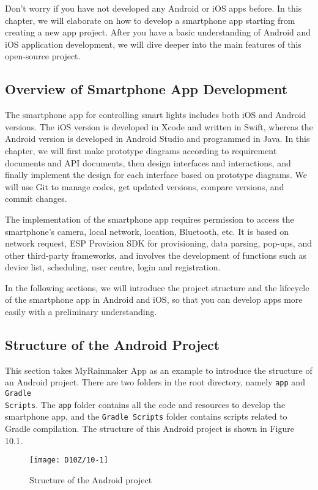 \documentclass[a4paper,12pt]{book}
\begin{document}
Don’t worry if you have not developed any Android or iOS apps before. In this chapter, we will elaborate on how to develop a smartphone app starting from creating a new app project. After you have a basic understanding of Android and iOS application development, we will dive deeper into the main features of this open-source project.

\subsection{Overview of Smartphone App Development}
The smartphone app for controlling smart lights includes both iOS and Android versions. The iOS version is developed in Xcode and written in Swift, whereas the Android version is developed in Android Studio and programmed in Java. In this chapter, we will first make prototype diagrams according to requirement documents and API documents, then design interfaces and interactions, and finally implement the design for each interface based on prototype diagrams. We will use Git to manage codes, get updated versions, compare versions, and commit changes.

The implementation of the smartphone app requires permission to access the smartphone’s camera, local network, location, Bluetooth, etc. It is based on network request, ESP Provision SDK for provisioning, data parsing, pop-ups, and other third-party frameworks, and involves the development of functions such as device list, scheduling, user centre, login and registration.

In the following sections, we will introduce the project structure and the lifecycle of the smartphone app in Android and iOS, so that you can develop apps more easily with a preliminary understanding.

\subsection{Structure of the Android Project}
This section takes MyRainmaker App as an example to introduce the structure of an Android project. There are two folders in the root directory, namely \verb|app| and \verb|Gradle |\\
\verb|Scripts|. The \verb|app| folder contains all the code and resources to develop the smartphone app, and the \verb|Gradle Scripts| folder contains scripts related to Gradle compilation. The structure of this Android project is shown in Figure 10.1.

\begin{figure}[ht]
    \centering
    \texttt{[image: D10Z/10-1]}
    \caption{Structure of the Android project}
\end{figure}
\end{document}
